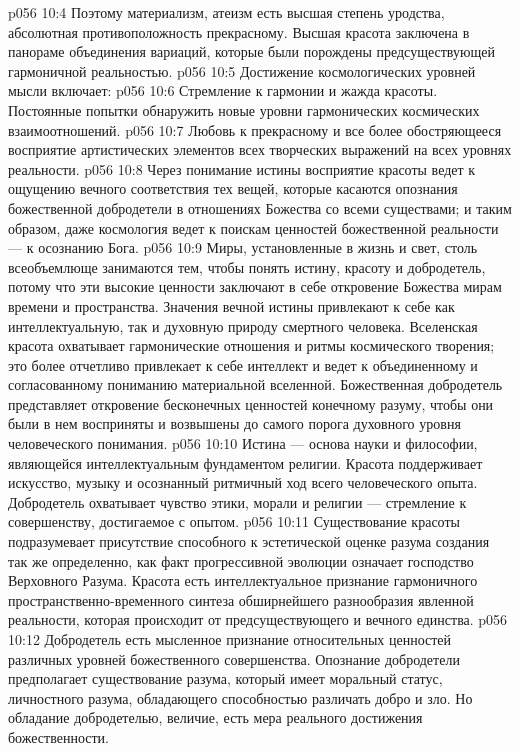 \vs p056 10:4 Поэтому материализм, атеизм есть высшая степень уродства, абсолютная противоположность прекрасному. Высшая красота заключена в панораме объединения вариаций, которые были порождены предсуществующей гармоничной реальностью.
\vs p056 10:5 Достижение космологических уровней мысли включает:
\vs p056 10:6 \bibnobreakspace {} Стремление к гармонии и жажда красоты. Постоянные попытки обнаружить новые уровни гармонических космических взаимоотношений.
\vs p056 10:7 \pc {}\bibnobreakspace {} Любовь к прекрасному и все более обостряющееся восприятие артистических элементов всех творческих выражений на всех уровнях реальности.
\vs p056 10:8 \pc {}\bibnobreakspace {} Через понимание истины восприятие красоты ведет к ощущению вечного соответствия тех вещей, которые касаются опознания божественной добродетели в отношениях Божества со всеми существами; и таким образом, даже космология ведет к поискам ценностей божественной реальности --- к осознанию Бога.
\vs p056 10:9 \pc Миры, установленные в жизнь и свет, столь всеобъемлюще занимаются тем, чтобы понять истину, красоту и добродетель, потому что эти высокие ценности заключают в себе откровение Божества мирам времени и пространства. Значения вечной истины привлекают к себе как интеллектуальную, так и духовную природу смертного человека. Вселенская красота охватывает гармонические отношения и ритмы космического творения; это более отчетливо привлекает к себе интеллект и ведет к объединенному и согласованному пониманию материальной вселенной. Божественная добродетель представляет откровение бесконечных ценностей конечному разуму, чтобы они были в нем восприняты и возвышены до самого порога духовного уровня человеческого понимания.
\vs p056 10:10 Истина --- основа науки и философии, являющейся интеллектуальным фундаментом религии. Красота поддерживает искусство, музыку и осознанный ритмичный ход всего человеческого опыта. Добродетель охватывает чувство этики, морали и религии --- стремление к совершенству, достигаемое с опытом.
\vs p056 10:11 Существование красоты подразумевает присутствие способного к эстетической оценке разума создания так же определенно, как факт прогрессивной эволюции означает господство Верховного Разума. Красота есть интеллектуальное признание гармоничного пространственно\hyp{}временного синтеза обширнейшего разнообразия явленной реальности, которая происходит от предсуществующего и вечного единства.
\vs p056 10:12 Добродетель есть мысленное признание относительных ценностей различных уровней божественного совершенства. Опознание добродетели предполагает существование разума, который имеет моральный статус, личностного разума, обладающего способностью различать добро и зло. Но обладание добродетелью, величие, есть мера реального достижения божественности.
